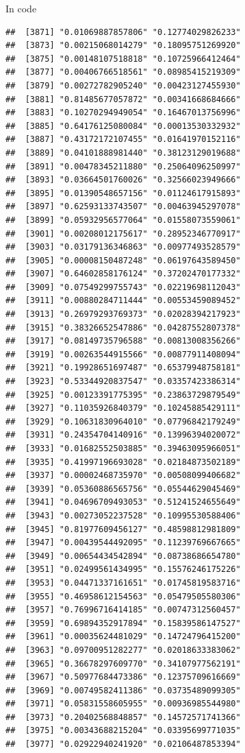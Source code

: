 \documentclass[ignorenonframetext,]{beamer}
\begin{document}
\begin{frame}[fragile]{In code}
\begin{verbatim}
##  [3871] "0.01069887857806" "0.12774029826233"
##  [3873] "0.00215068014279" "0.18095751269920"
##  [3875] "0.00148107518818" "0.10725966412464"
##  [3877] "0.00406766518561" "0.08985415219309"
##  [3879] "0.00272782905240" "0.00423127455930"
##  [3881] "0.81485677057872" "0.00341668684666"
##  [3883] "0.10270294949054" "0.16467013756996"
##  [3885] "0.64176125080084" "0.00013530332932"
##  [3887] "0.43172172107455" "0.01641970152116"
##  [3889] "0.04101888981440" "0.38123129019688"
##  [3891] "0.00478345211880" "0.25064096250997"
##  [3893] "0.03664501760026" "0.32566023949666"
##  [3895] "0.01390548657156" "0.01124617915893"
##  [3897] "0.62593133743507" "0.00463945297078"
##  [3899] "0.05932956577064" "0.01558073559061"
##  [3901] "0.00208012175617" "0.28952346770917"
##  [3903] "0.03179136346863" "0.00977493528579"
##  [3905] "0.00008150487248" "0.06197643589450"
##  [3907] "0.64602858176124" "0.37202470177332"
##  [3909] "0.07549299755743" "0.02219698112043"
##  [3911] "0.00880284711444" "0.00553459089452"
##  [3913] "0.26979293769373" "0.02028394217923"
##  [3915] "0.38326652547886" "0.04287552807378"
##  [3917] "0.08149735796588" "0.00813008356266"
##  [3919] "0.00263544915566" "0.00877911408094"
##  [3921] "0.19928651697487" "0.65379948758181"
##  [3923] "0.53344920837547" "0.03357423386314"
##  [3925] "0.00123391775395" "0.23863729879549"
##  [3927] "0.11035926840379" "0.10245885429111"
##  [3929] "0.10631830964010" "0.07796842179249"
##  [3931] "0.24354704140916" "0.13996394020072"
##  [3933] "0.01682552503885" "0.39463095966051"
##  [3935] "0.41997196693028" "0.02184873502189"
##  [3937] "0.00002468735970" "0.00508099406682"
##  [3939] "0.05360886565756" "0.05544629045469"
##  [3941] "0.04696709493053" "0.51241524655649"
##  [3943] "0.00273052237528" "0.10995530588406"
##  [3945] "0.81977609456127" "0.48598812981809"
##  [3947] "0.00439544492095" "0.11239769667665"
##  [3949] "0.00654434542894" "0.08738686654780"
##  [3951] "0.02499561434995" "0.15576246175226"
##  [3953] "0.04471337161651" "0.01745819583716"
##  [3955] "0.46958612154563" "0.05479505580306"
##  [3957] "0.76996716414185" "0.00747312560457"
##  [3959] "0.69894352917894" "0.15839586147527"
##  [3961] "0.00035624481029" "0.14724796415200"
##  [3963] "0.09700951282277" "0.02018633383062"
##  [3965] "0.36678297609770" "0.34107977562191"
##  [3967] "0.50977684473386" "0.12375709616669"
##  [3969] "0.00749582411386" "0.03735489099305"
##  [3971] "0.05831558605955" "0.00936985544980"
##  [3973] "0.20402568848857" "0.14572571741366"
##  [3975] "0.00343688215204" "0.03395699771035"
##  [3977] "0.02922940241920" "0.02106487853394"

\end{verbatim}
\end{frame}
\end{document}
